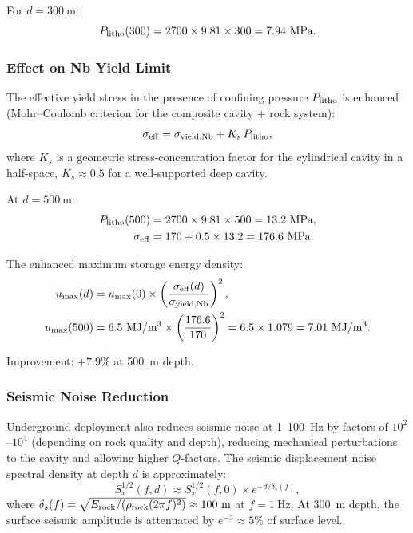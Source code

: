 \documentclass[aps,prd,twocolumn,superscriptaddress]{revtex4-2}
\begin{document}
For $d = 300~\mathrm{m}$:
\begin{equation}
P_{\rm litho}(300) = 2700\times 9.81\times 300 = 7.94~\mathrm{MPa}.
\end{equation}

\subsubsection{Effect on Nb Yield Limit}

The effective yield stress in the presence of confining pressure
$P_{\rm litho}$ is enhanced (Mohr--Coulomb criterion for the composite
cavity + rock system):
\begin{equation}
\sigma_{\rm eff} = \sigma_{\rm yield,Nb} + K_s\,P_{\rm litho},
\end{equation}
where $K_s$ is a geometric stress-concentration factor for the
cylindrical cavity in a half-space, $K_s \approx 0.5$ for a
well-supported deep cavity.

At $d = 500~\mathrm{m}$:
\begin{align}
P_{\rm litho}(500) &= 2700\times 9.81\times 500 = 13.2~\mathrm{MPa}, \\
\sigma_{\rm eff} &= 170 + 0.5\times 13.2 = 176.6~\mathrm{MPa}.
\end{align}

The enhanced maximum storage energy density:
\begin{align}
u_{\rm max}(d) &= u_{\rm max}(0)\times\left(\frac{\sigma_{\rm eff}(d)}{\sigma_{\rm yield,Nb}}\right)^2, \\
u_{\rm max}(500) &= 6.5~\mathrm{MJ/m^3}\times\left(\frac{176.6}{170}\right)^2
= 6.5\times 1.079 = 7.01~\mathrm{MJ/m^3}.
\end{align}

Improvement: $+7.9\%$ at 500~m depth.

\subsubsection{Seismic Noise Reduction}

Underground deployment also reduces seismic noise at 1--100~Hz by
factors of $10^2$--$10^4$ (depending on rock quality and depth),
reducing mechanical perturbations to the cavity and allowing higher
$Q$-factors.  The seismic displacement noise spectral density at
depth $d$ is approximately:
\begin{equation}
S_x^{1/2}(f,d) \approx S_x^{1/2}(f,0)\times e^{-d/\delta_s(f)},
\end{equation}
where $\delta_s(f) = \sqrt{E_{\rm rock}/(\rho_{\rm rock}(2\pi f)^2)}
\approx 100~\mathrm{m}$ at $f = 1~\mathrm{Hz}$.  At 300~m depth,
the surface seismic amplitude is attenuated by $e^{-3} \approx 5\%$
of surface level.
\end{document}

